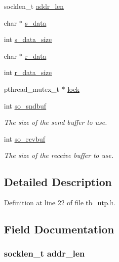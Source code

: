 \begin{DoxyCompactItemize}
\item 
socklen\-\_\-t \hyperlink{structtb__utp__t_a116941d922ae354d7241d04b0f3c84d8}{addr\-\_\-len}
\item 
char $\ast$ \hyperlink{structtb__utp__t_acf38f384acf7d5603daf8ddcd2a71a25}{s\-\_\-data}
\item 
int \hyperlink{structtb__utp__t_a9572e5f95cdcd648c1973020b5f4a25b}{s\-\_\-data\-\_\-size}
\item 
char $\ast$ \hyperlink{structtb__utp__t_a4298ec565665ee4e72e4b28434546602}{r\-\_\-data}
\item 
int \hyperlink{structtb__utp__t_a53fb5c97e533c0555ca3ed99facdb1d5}{r\-\_\-data\-\_\-size}
\item 
pthread\-\_\-mutex\-\_\-t $\ast$ \hyperlink{structtb__utp__t_a33586b4184d23f2b8f4df153ec23af13}{lock}
\item 
int \hyperlink{structtb__utp__t_aae962af134e15f29f1dd0b005fc3ff2c}{so\-\_\-sndbuf}
\begin{DoxyCompactList}\small\item\em The size of the send buffer to use. \end{DoxyCompactList}\item 
int \hyperlink{structtb__utp__t_a739481faef9852a57d912b2a31b5a8fc}{so\-\_\-rcvbuf}
\begin{DoxyCompactList}\small\item\em The size of the receive buffer to use. \end{DoxyCompactList}\end{DoxyCompactItemize}


\subsection{Detailed Description}


Definition at line 22 of file tb\-\_\-utp.\-h.



\subsection{Field Documentation}
\hypertarget{structtb__utp__t_a116941d922ae354d7241d04b0f3c84d8}{
\subsubsection[{addr\-\_\-len}]{\setlength{\rightskip}{0pt plus 5cm}socklen\-\_\-t addr\-\_\-len}}\label{structtb__utp__t_a116941d922ae354d7241d04b0f3c84d8}


